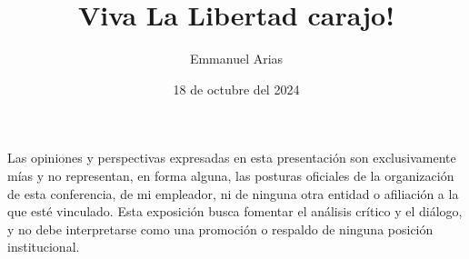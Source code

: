 \documentclass{beamer}
\title{Viva La Libertad carajo!}
\author{Emmanuel Arias}
\date{18 de octubre del 2024}
\begin{document}
\begin{frame}[plain]
    \maketitle
\end{frame}

\begin{frame}
  \centering
  Las opiniones y perspectivas expresadas en esta presentación son exclusivamente mías y no representan, en forma alguna, las posturas oficiales de la organización de esta conferencia, de mi empleador, ni de ninguna otra entidad o afiliación a la que esté vinculado. Esta exposición busca fomentar el análisis crítico y el diálogo, y no debe interpretarse como una promoción o respaldo de ninguna posición institucional.
\end{frame}
\end{document}
